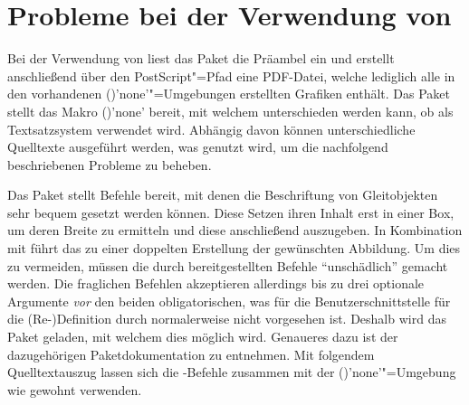 \section{Probleme bei der Verwendung von }
%
Bei der Verwendung von  liest das Paket  
die Präambel ein und erstellt anschließend über den PostScript"=Pfad 
 eine PDF-Datei, 
welche lediglich alle in den vorhandenen 
()'none'"=Umgebungen erstellten 
Grafiken enthält. Das Paket  stellt das Makro 
()'none' bereit, mit welchem unterschieden werden 
kann, ob  als Textsatzsystem verwendet wird. Abhängig davon 
können unterschiedliche Quelltexte ausgeführt werden, was genutzt wird, um die 
nachfolgend beschriebenen Probleme zu beheben.
%
\begin{quoting}
\begin{Code}
\usepackage{ifpdf}
\end{Code}
\end{quoting}

Das Paket  stellt Befehle bereit, mit denen die Beschriftung 
von Gleitobjekten sehr bequem gesetzt werden können. Diese Setzen ihren Inhalt 
erst in einer Box, um deren Breite zu ermitteln und diese anschließend 
auszugeben. In Kombination mit  führt das zu einer 
doppelten Erstellung der gewünschten Abbildung. Um dies zu vermeiden, müssen 
die durch  bereitgestellten Befehle \enquote{unschädlich} 
gemacht werden. Die fraglichen Befehlen akzeptieren allerdings bis zu drei 
optionale Argumente \emph{vor} den beiden obligatorischen, was für die 
Benutzerschnittstelle für die (Re-)Definition durch  
normalerweise nicht vorgesehen ist. Deshalb wird das Paket  
geladen, mit welchem dies möglich wird. Genaueres dazu ist der dazugehörigen 
Paketdokumentation zu entnehmen. Mit folgendem Quelltextauszug lassen sich die 
-Befehle zusammen mit der 
()'none'"=Umgebung wie gewohnt 
verwenden.
%
\begin{quoting}
\begin{Code}
\usepackage{floatrow}
\usepackage{xparse}
\ifpdf\else
\fi
\end{Code}
\end{quoting}

